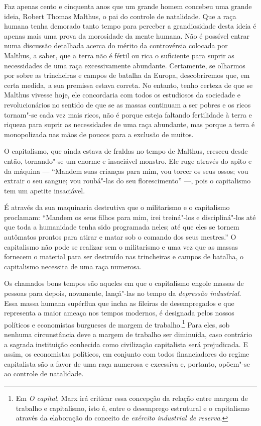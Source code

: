 Faz apenas cento e cinquenta anos que um grande homem concebeu uma
grande ideia, Robert Thomas Malthus, o pai do controle de natalidade.
Que a raça humana tenha demorado tanto tempo para perceber a
grandiosidade desta ideia é apenas mais uma prova da morosidade da mente
humana. Não é possível entrar numa discussão detalhada acerca do mérito
da controvérsia colocada por Malthus, a saber, que a terra não é fértil
ou rica o suficiente para suprir as necessidades de uma raça
excessivamente abundante. Certamente, se olharmos por sobre as
trincheiras e campos de batalha da Europa, descobriremos que, em
certa medida, a sua premissa estava correta. No entanto, tenho certeza
de que se Malthus vivesse hoje, ele concordaria com todos os estudiosos
da sociedade e revolucionários no sentido de que se as massas continuam
a ser pobres e os ricos tornam"-se cada vez mais ricos, não é porque
esteja faltando fertilidade à terra e riqueza para suprir as
necessidades de uma raça abundante, mas porque a terra é monopolizada
nas mãos de poucos para a exclusão de muitos.

O capitalismo, que ainda estava de fraldas no tempo de Malthus, cresceu
desde então, tornando"-se um enorme e insaciável monstro. Ele ruge
através do apito e da máquina --- ``Mandem suas crianças para mim, vou
torcer os seus ossos; vou extrair o seu sangue; vou roubá"-las do seu
florescimento'' ---, pois o capitalismo tem um apetite insaciável.

É através da sua maquinaria destrutiva que o militarismo e o capitalismo
proclamam: ``Mandem os seus filhos para mim, irei treiná"-los e
discipliná"-los até que toda a humanidade tenha sido programada neles;
até que eles se tornem autômatos prontos para atirar e matar sob o
comando dos seus mestres.'' O capitalismo não pode se realizar sem o
militarismo e uma vez que as massas fornecem o material para ser destruído
nas trincheiras e campos de batalha, o capitalismo necessita de uma raça
numerosa.

Os chamados bons tempos são aqueles em que o capitalismo engole massas
de pessoas para depois, novamente, lançá"-las no tempo da \textit{depressão
industrial}. Essa massa humana supérflua que incha as fileiras de
desempregados e que representa a maior ameaça nos tempos modernos, é
designada pelos nossos políticos e economistas burgueses de margem de
trabalho.\footnote{Em \textit{O capital}, Marx irá criticar essa concepção da relação entre margem de trabalho e capitalismo, isto é, entre o desemprego estrutural e o capitalismo através da elaboração do conceito de \textit{exército industrial de reserva}.} Para eles, sob nenhuma circunstância deve a margem de trabalho
ser diminuída, caso contrário a sagrada instituição conhecida como
civilização capitalista será prejudicada. E assim, os economistas\label{margem}
políticos, em conjunto com todos financiadores do regime capitalista são
a favor de uma raça numerosa e excessiva e, portanto, opõem"-se ao
controle de natalidade.

